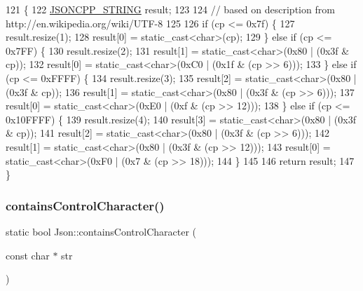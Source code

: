 \begin{DoxyCode}
121                                                               \{
122   \hyperlink{json_8h_a1e723f95759de062585bc4a8fd3fa4be}{JSONCPP\_STRING} result;
123 
124   \textcolor{comment}{// based on description from http://en.wikipedia.org/wiki/UTF-8}
125 
126   \textcolor{keywordflow}{if} (cp <= 0x7f) \{
127     result.resize(1);
128     result[0] = \textcolor{keyword}{static\_cast<}\textcolor{keywordtype}{char}\textcolor{keyword}{>}(cp);
129   \} \textcolor{keywordflow}{else} \textcolor{keywordflow}{if} (cp <= 0x7FF) \{
130     result.resize(2);
131     result[1] = \textcolor{keyword}{static\_cast<}\textcolor{keywordtype}{char}\textcolor{keyword}{>}(0x80 | (0x3f & cp));
132     result[0] = \textcolor{keyword}{static\_cast<}\textcolor{keywordtype}{char}\textcolor{keyword}{>}(0xC0 | (0x1f & (cp >> 6)));
133   \} \textcolor{keywordflow}{else} \textcolor{keywordflow}{if} (cp <= 0xFFFF) \{
134     result.resize(3);
135     result[2] = \textcolor{keyword}{static\_cast<}\textcolor{keywordtype}{char}\textcolor{keyword}{>}(0x80 | (0x3f & cp));
136     result[1] = \textcolor{keyword}{static\_cast<}\textcolor{keywordtype}{char}\textcolor{keyword}{>}(0x80 | (0x3f & (cp >> 6)));
137     result[0] = \textcolor{keyword}{static\_cast<}\textcolor{keywordtype}{char}\textcolor{keyword}{>}(0xE0 | (0xf & (cp >> 12)));
138   \} \textcolor{keywordflow}{else} \textcolor{keywordflow}{if} (cp <= 0x10FFFF) \{
139     result.resize(4);
140     result[3] = \textcolor{keyword}{static\_cast<}\textcolor{keywordtype}{char}\textcolor{keyword}{>}(0x80 | (0x3f & cp));
141     result[2] = \textcolor{keyword}{static\_cast<}\textcolor{keywordtype}{char}\textcolor{keyword}{>}(0x80 | (0x3f & (cp >> 6)));
142     result[1] = \textcolor{keyword}{static\_cast<}\textcolor{keywordtype}{char}\textcolor{keyword}{>}(0x80 | (0x3f & (cp >> 12)));
143     result[0] = \textcolor{keyword}{static\_cast<}\textcolor{keywordtype}{char}\textcolor{keyword}{>}(0xF0 | (0x7 & (cp >> 18)));
144   \}
145 
146   \textcolor{keywordflow}{return} result;
147 \}
\end{DoxyCode}
\mbox{\label{namespace_json_aa11b210ff98a4f4dd4e2df19260f8c3a}} 
\subsubsection{\texorpdfstring{contains\+Control\+Character()}{containsControlCharacter()}}
{\footnotesize\ttfamily static bool Json\+::contains\+Control\+Character (\begin{DoxyParamCaption}\item[{const char $\ast$}]{str }\end{DoxyParamCaption})\hspace{0.3cm}{\ttfamily [static]}}



